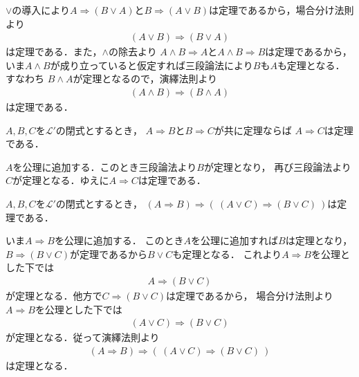 	\begin{prf}
		$\vee$の導入により$A \Longrightarrow (B \vee A)$と$B \Longrightarrow (A \vee B)$は定理であるから，場合分け法則より
		\begin{align}
			(A \vee B) \Longrightarrow (B \vee A)
		\end{align}
		は定理である．また，$\wedge$の除去より
		$A \wedge B \Longrightarrow A$と$A \wedge B \Longrightarrow B$は定理であるから，
		いま$A \wedge B$が成り立っていると仮定すれば三段論法により$B$も$A$も定理となる．すなわち
		$B \wedge A$が定理となるので，演繹法則より
		\begin{align}
			(A \wedge B) \Longrightarrow (B \wedge A)
		\end{align}
		は定理である．
		\QED
	\end{prf}
	
	\begin{screen}
		\begin{metathm}[推移律]
			$A,B,C$を$\mathcal{L}'$の閉式とするとき，
			$A \Longrightarrow B$と$B \Longrightarrow C$が共に定理ならば
			$A \Longrightarrow C$は定理である．
		\end{metathm}
	\end{screen}
	
	\begin{prf}
		$A$を公理に追加する．このとき三段論法より$B$が定理となり，
		再び三段論法より$C$が定理となる．ゆえに$A \Longrightarrow C$は定理である．
		\QED
	\end{prf}
	
	\begin{screen}
		\begin{metathm}\label{metathm:rule_of_inference_1}
			$A,B,C$を$\mathcal{L}'$の閉式とするとき，
			$(A \Longrightarrow B) \Longrightarrow 
			(\ (A \vee C) \Longrightarrow (B \vee C)\ )$は定理である．
		\end{metathm}
	\end{screen}
	
	\begin{prf}
		いま$A \Longrightarrow B$を公理に追加する．
		このとき$A$を公理に追加すれば$B$は定理となり，
		$B \Longrightarrow (B \vee C)$が定理であるから$B \vee C$も定理となる．
		これより$A \Longrightarrow B$を公理とした下では
		\begin{align}
			A \Longrightarrow (B \vee C)
		\end{align}
		が定理となる．他方で$C \Longrightarrow (B \vee C)$は定理であるから，
		場合分け法則より$A \Longrightarrow B$を公理とした下では
		\begin{align}
			(A \vee C) \Longrightarrow (B \vee C)
		\end{align}
		が定理となる．従って演繹法則より
		\begin{align}
			(A \Longrightarrow B) \Longrightarrow 
			(\ (A \vee C) \Longrightarrow (B \vee C)\ )
		\end{align}
		は定理となる．
		\QED
	\end{prf}
	
